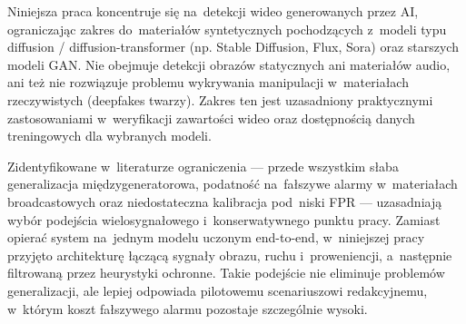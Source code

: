 Niniejsza praca koncentruje si\k{e} na~detekcji wideo generowanych przez AI,
ograniczaj\k{a}c zakres do~materia\l{}\'{o}w syntetycznych pochodz\k{a}cych
z~modeli typu diffusion / diffusion-transformer (np. Stable Diffusion, Flux, Sora)
oraz starszych modeli GAN.
Nie obejmuje detekcji obraz\'{o}w statycznych ani materia\l{}\'{o}w audio,
ani te\.{z} nie rozwi\k{a}zuje problemu wykrywania manipulacji w~materia\l{}ach
rzeczywistych (deepfakes twarzy). Zakres ten jest uzasadniony praktycznymi
zastosowaniami w~weryfikacji zawarto\'{s}ci wideo oraz dost\k{e}pno\'{s}ci\k{a}
danych treningowych dla wybranych modeli.

Zidentyfikowane w~literaturze ograniczenia --- przede wszystkim słaba generalizacja
międzygeneratorowa, podatność na~fałszywe alarmy w~materiałach broadcastowych oraz
niedostateczna kalibracja pod~niski FPR --- uzasadniają wybór podejścia
wielosygnałowego i~konserwatywnego punktu pracy. Zamiast opierać system na~jednym
modelu uczonym end-to-end, w~niniejszej pracy przyjęto architekturę łączącą sygnały
obrazu, ruchu i~proweniencji, a~następnie filtrowaną przez heurystyki ochronne.
Takie podejście nie eliminuje problemów generalizacji, ale lepiej odpowiada
pilotowemu scenariuszowi redakcyjnemu, w~którym koszt fałszywego alarmu pozostaje
szczególnie wysoki.
